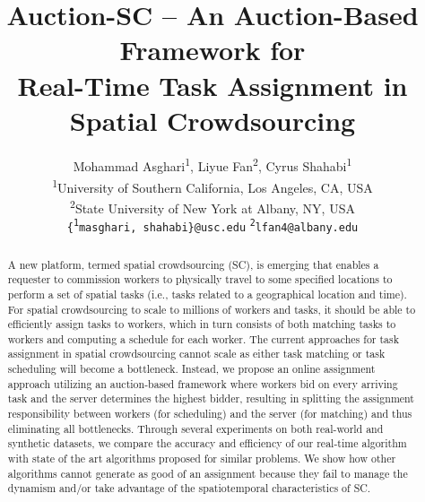 \documentclass{sig-alternate}
\title{Auction-SC -- An Auction-Based Framework for\\ Real-Time Task Assignment in Spatial Crowdsourcing}
\newcommand*{\myaffaddr}[1]{#1} %
\newcommand*{\myaffmark}[1][*]{\textsuperscript{#1}}
\newcommand*{\myemail}[1]{\texttt{#1}}
\begin{document}
\sloppy

\author{{Mohammad Asghari\myaffmark[1], Liyue Fan\myaffmark[2], Cyrus Shahabi\myaffmark[1]}\\
\myaffaddr{\myaffmark[1]University of Southern California, Los Angeles, CA, USA}\\
\myaffaddr{\myaffmark[2]State University of New York at Albany, NY, USA}\\
\myemail{\{\myaffmark[1]masghari, shahabi\}@usc.edu}    \myemail{\myaffmark[2]lfan4@albany.edu}\\
}



\maketitle

\begin{abstract}

A new platform, termed spatial crowdsourcing (SC), is emerging that enables a requester to commission workers to physically travel to some specified locations to perform a set of spatial tasks (i.e., tasks related to a geographical location and time). For spatial crowdsourcing to scale to millions of workers and tasks, it should be able to efficiently assign tasks to workers, which in turn consists of both matching tasks to workers and computing a schedule for each worker. The current approaches for task assignment in spatial crowdsourcing cannot scale as either task matching or task scheduling will become a bottleneck.  Instead, we propose an online assignment approach utilizing an auction-based framework where workers bid on every arriving task and the server determines the highest bidder, resulting in splitting the assignment responsibility between workers (for scheduling) and the server (for matching) and thus eliminating all bottlenecks. Through several experiments on both real-world and synthetic datasets, we compare the accuracy and efficiency of our real-time algorithm with state of the art algorithms proposed for similar problems. We show how other algorithms cannot generate as good of an assignment because they fail to manage the dynamism and/or take advantage of the spatiotemporal characteristics of SC.

\end{abstract}







%







\begin{scriptsize}


\end{scriptsize}

%
\end{document}
